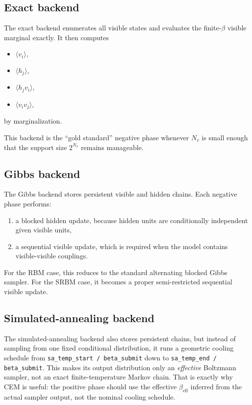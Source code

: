 \documentclass[11pt]{article}
\begin{document}
\subsection{Exact backend}

The exact backend enumerates all visible states and evaluates the finite-$\beta$
visible marginal exactly. It then computes
\begin{itemize}
  \item $\langle v_i\rangle$,
  \item $\langle h_j\rangle$,
  \item $\langle h_j v_i\rangle$,
  \item $\langle v_i v_j\rangle$,
\end{itemize}
by marginalization.

This backend is the ``gold standard'' negative phase whenever $N_v$ is small
enough that the support size $2^{N_v}$ remains manageable.

\subsection{Gibbs backend}

The Gibbs backend stores persistent visible and hidden chains. Each negative
phase performs:
\begin{enumerate}
  \item a blocked hidden update, because hidden units are conditionally
  independent given visible units,
  \item a sequential visible update, which is required when the model contains
  visible-visible couplings.
\end{enumerate}

For the RBM case, this reduces to the standard alternating blocked Gibbs sampler.
For the SRBM case, it becomes a proper semi-restricted sequential visible update.

\subsection{Simulated-annealing backend}

The simulated-annealing backend also stores persistent chains, but instead of
sampling from one fixed conditional distribution, it runs a geometric cooling
schedule from \texttt{sa\_temp\_start / beta\_submit} down to
\texttt{sa\_temp\_end / beta\_submit}. This makes its output distribution only an
\emph{effective} Boltzmann sampler, not an exact finite-temperature Markov chain.
That is exactly why CEM is useful: the positive phase should use the effective
$\beta_{\mathrm{eff}}$ inferred from the actual sampler output, not the nominal
cooling schedule.
\end{document}
